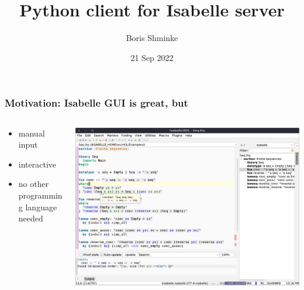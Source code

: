 \documentclass{beamer}
\title{Python client for Isabelle server}
\author{Boris Shminke}
\institute{Université Côte d’Azur, CNRS, LJAD, France}
\date{21 Sep 2022}
\begin{document}
\begin{frame}
\titlepage
\end{frame}
\begin{frame}
\frametitle{Motivation: Isabelle GUI is great, but}
\begin{columns}[T]
\begin{column}{0.3\textwidth}
\begin{itemize}
\item manual input
\item interactive
\item no other programming language needed
\end{itemize}
\end{column}
\begin{column}{0.7\textwidth}
\includegraphics[width=\paperwidth,height=\paperheight]{isabelle_jedit}
\end{column}
\end{columns}
\end{frame}
\end{document}

